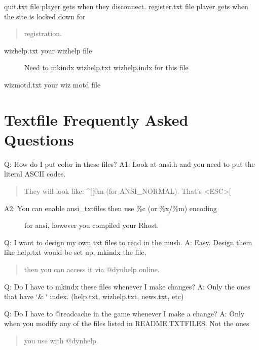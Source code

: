 \documentclass[letterpaper,10pt,english]{sphinxmanual}
\begin{document}
\sphinxAtStartPar
quit.txt               \sphinxhyphen{} file player gets when they disconnect.
register.txt           \sphinxhyphen{} file player gets when the site is locked down for
\begin{quote}

\sphinxAtStartPar
registration.
\end{quote}
\begin{description}
\item[{wizhelp.txt            \sphinxhyphen{} your wizhelp file}] \leavevmode
\sphinxAtStartPar
{}  Need to mkindx wizhelp.txt wizhelp.indx for this file

\end{description}

\sphinxAtStartPar
wizmotd.txt            \sphinxhyphen{} your wiz motd file


\section{Textfile Frequently Asked Questions}
\label{\detokenize{35-txtfiles:textfile-frequently-asked-questions}}
\sphinxAtStartPar
Q:  How do I put color in these files?
A1: Look at ansi.h and you need to put the literal ASCII codes.
\begin{quote}

\sphinxAtStartPar
They will look like: \textasciicircum{}{[}{[}0m (for ANSI\_NORMAL).  That’s \textless{}ESC\textgreater{}{[}
\end{quote}
\begin{description}
\item[{A2: You can enable ansi\_txtfiles then use \%c (or \%x/\%m) encoding}] \leavevmode
\sphinxAtStartPar
for ansi, however you compiled your Rhost.

\end{description}

\sphinxAtStartPar
Q:  I want to design my own txt files to read in the mush.
A:  Easy.  Design them like help.txt would be set up, mkindx the file,
\begin{quote}

\sphinxAtStartPar
then you can access it via @dynhelp online.
\end{quote}

\sphinxAtStartPar
Q:  Do I have to mkindx these files whenever I make changes?
A:  Only the ones that have ‘\& ‘ index. (help.txt, wizhelp.txt, news.txt, etc)

\sphinxAtStartPar
Q:  Do I have to @readcache in the game whenever I make a change?
A:  Only when you modify any of the files listed in README.TXTFILES.  Not the ones
\begin{quote}

\sphinxAtStartPar
you use with @dynhelp.
\end{quote}
\end{document}
